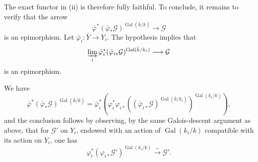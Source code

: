 The exact functor in (ii) is therefore fully faithful.  To conclude, it
remains to verify that the arrow
\begin{equation*}
\bar\varphi^*(\bar\varphi_*\mathcal G)^{
  \operatorname{Gal}(\bar k/k)}\longrightarrow\mathcal G
\end{equation*}
is an epimorphism.  Let $\bar\varphi_i:\bar Y\longrightarrow Y_i$.
The hypothesis implies that
\begin{equation*}
\varinjlim_i
\bar\varphi_i^*(\bar\varphi_{i*}\mathcal G)^{
  \operatorname{Gal}(\bar k/k_i)}
\longrightarrow\mathcal G
\end{equation*}
is an epimorphism.


We have
\begin{equation*}
\bar\varphi^*(\bar\varphi_*\mathcal G)^{
  \operatorname{Gal}(\bar k/k)}
=
\bar\varphi_i^*\!\left(
  \varphi_i^*\varphi_{i*}
  \left((\bar\varphi_{i*}\mathcal G)^{
    \operatorname{Gal}(\bar k/k_i)}\right)^{
    \operatorname{Gal}(k_i/k)}
\right),
\end{equation*}
and the conclusion follows by observing, by the same Galois-descent
argument as above, that for $\mathcal G'$ on $Y_i$, endowed with an
action of $\operatorname{Gal}(k_i/k)$ compatible with its action on
$Y_i$, one has
\begin{equation*}
\varphi_i^*(\varphi_{i*}\mathcal G')^{
  \operatorname{Gal}(k_i/k)}
\xrightarrow{\sim}\mathcal G'.
\end{equation*}
